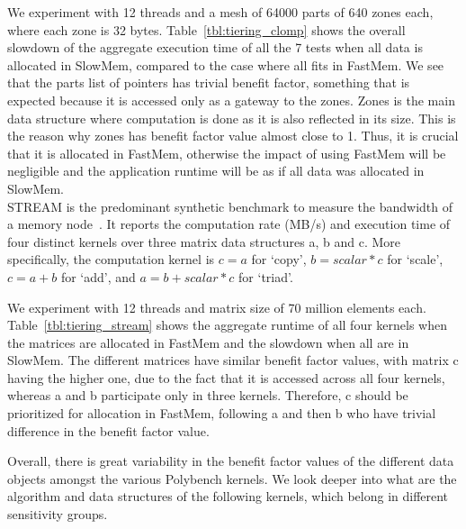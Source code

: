 We experiment with 12 threads and a mesh of 64000 parts of 640 zones each, where each zone is 32 bytes. 
Table~\ref{tbl:tiering_clomp} shows the overall slowdown of the aggregate execution time of all the 7 tests when all data is allocated in SlowMem, compared to the case where all fits in FastMem. We see that the {\ttfamily parts} list of pointers has trivial benefit factor, something that is expected because it is accessed only as a gateway to the {\ttfamily zones}.  {\ttfamily Zones} is the main data structure where computation is done as it is also reflected in its size. This is the reason why {\ttfamily zones} has benefit factor value almost close to 1. Thus, it is crucial that it is allocated in FastMem, otherwise the impact of using FastMem will be negligible and the application runtime will be as if all data was allocated in SlowMem.\\

 STREAM is the predominant synthetic benchmark  to measure the bandwidth of a memory node~\cite{stream}. It reports the computation rate (MB/s) and execution time of four distinct kernels over three matrix data structures {\ttfamily a}, {\ttfamily b} and {\ttfamily c}. More specifically, the computation kernel is  \(c = a\) for `copy', \(b = scalar*c\) for `scale', \(c = a + b\) for `add', and \(a = b + scalar*c\) for `triad'.

We experiment with 12 threads and matrix size of 70 million elements each. Table~\ref{tbl:tiering_stream} shows the aggregate runtime of all four kernels when the matrices are allocated in FastMem and the slowdown when all are in SlowMem. The different matrices have similar benefit factor values, with matrix {\ttfamily c} having the higher one, due to the fact that it is accessed across all four kernels, whereas {\ttfamily a} and {\ttfamily b} participate only in three kernels. Therefore, {\ttfamily c} should be prioritized for allocation in FastMem, following {\ttfamily a} and then {\ttfamily b} who have trivial difference in the benefit factor value. \\

\vspace{1ex}
\vspace{0.3ex}

\noindent Overall, there is great variability in the benefit factor values of the different data objects amongst the various Polybench kernels. We look deeper into what are the algorithm and data structures of the following kernels, which belong in different sensitivity groups. \\


